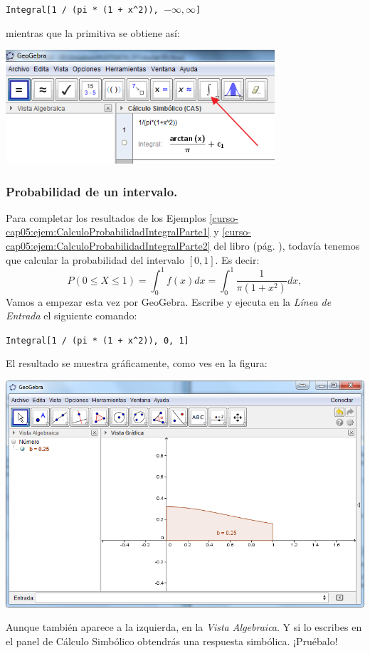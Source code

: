 \documentclass[10pt,a4paper]{article}\usepackage[]{graphicx}\usepackage[]{color}
\begin{document}
        \begin{center}
        \verb#Integral[1 / (pi * (1 + x^2)), #$-\infty, \infty${\tt ]}
        \end{center}
mientras que la primitiva se obtiene así:
\begin{center}
    \includegraphics[width=10cm]{../fig/Tut05-48.png}
\end{center}

\subsubsection{Probabilidad de un intervalo.}

Para completar los resultados de los Ejemplos \ref{curso-cap05:ejem:CalculoProbabilidadIntegralParte1} y \ref{curso-cap05:ejem:CalculoProbabilidadIntegralParte2} del libro (pág. \pageref{curso-cap05:ejem:CalculoProbabilidadIntegralParte1}), todavía tenemos que calcular la probabilidad del intervalo $[0,1]$. Es decir:
    \[
    P(0\leq X\leq 1)=\int_0^1f(x)dx=\int_0^1\dfrac{1}{\pi(1+x^2)}dx,
    \]
Vamos a empezar esta vez por GeoGebra. Escribe y ejecuta en la {\em Línea de Entrada} el siguiente comando:
\begin{center}
  \verb#Integral[1 / (pi * (1 + x^2)), 0, 1]#
\end{center}
El resultado se muestra gráficamente, como ves en la figura:
\begin{center}
    \includegraphics[width=15cm]{../fig/Tut05-49.png}
\end{center}
Aunque también aparece a la izquierda, en la {\em Vista Algebraica}. Y si lo escribes en el panel de Cálculo Simbólico obtendrás una respuesta simbólica. ¡Pruébalo!
\end{document}
